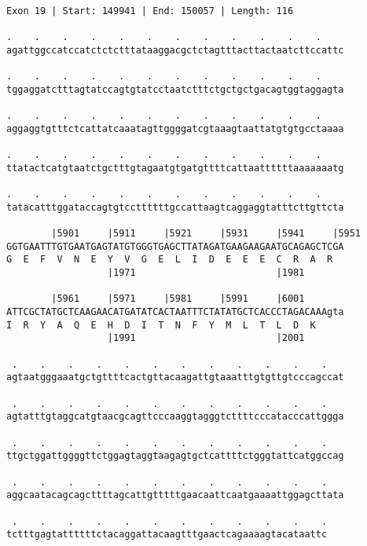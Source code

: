 \documentclass{article}
\begin{document}
\newpage
\begin{Verbatim}
Exon 19 | Start: 149941 | End: 150057 | Length: 116
 
.    .    .    .    .    .    .    .    .    .    .    .    
agattggccatccatctctctttataaggacgctctagtttacttactaatcttccattc
  
.    .    .    .    .    .    .    .    .    .    .    .    
tggaggatctttagtatccagtgtatcctaatctttctgctgctgacagtggtaggagta
  
.    .    .    .    .    .    .    .    .    .    .    .    
aggaggtgtttctcattatcaaatagttggggatcgtaaagtaattatgtgtgcctaaaa
  
.    .    .    .    .    .    .    .    .    .    .    .    
ttatactcatgtaatctgctttgtagaatgtgatgttttcattaattttttaaaaaaatg
  
.    .    .    .    .    .    .    .    .    .    .    .    
tatacatttggataccagtgtccttttttgccattaagtcaggaggtatttcttgttcta
  
        |5901     |5911     |5921     |5931     |5941     |5951
GGTGAATTTGTGAATGAGTATGTGGGTGAGCTTATAGATGAAGAAGAATGCAGAGCTCGA
G  E  F  V  N  E  Y  V  G  E  L  I  D  E  E  E  C  R  A  R  
                  |1971                         |1981       
  
        |5961     |5971     |5981     |5991     |6001       
ATTCGCTATGCTCAAGAACATGATATCACTAATTTCTATATGCTCACCCTAGACAAAgta
I  R  Y  A  Q  E  H  D  I  T  N  F  Y  M  L  T  L  D  K     
                  |1991                         |2001       
  
 .    .    .    .    .    .    .    .    .    .    .    .   
agtaatgggaaatgctgttttcactgttacaagattgtaaatttgtgttgtcccagccat
  
 .    .    .    .    .    .    .    .    .    .    .    .   
agtatttgtaggcatgtaacgcagttcccaaggtagggtcttttcccatacccattggga
  
 .    .    .    .    .    .    .    .    .    .    .    .   
ttgctggattggggttctggagtaggtaagagtgctcattttctgggtattcatggccag
  
 .    .    .    .    .    .    .    .    .    .    .    .   
aggcaatacagcagcttttagcattgtttttgaacaattcaatgaaaattggagcttata
  
 .    .    .    .    .    .    .    .    .    .    .    .
tctttgagtattttttctacaggattacaagtttgaactcagaaaagtacataattc
\end{Verbatim}
\newpage
\end{document}
